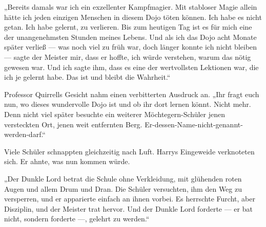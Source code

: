 „Bereits damals war ich ein exzellenter Kampfmagier. Mit stabloser Magie allein hätte ich jeden einzigen Menschen in diesem Dojo töten können. Ich habe es nicht getan. Ich habe gelernt, zu verlieren. Bis zum heutigen Tag ist es für mich eine der unangenehmsten Stunden meines Lebens. Und als ich das Dojo acht Monate später verließ — was noch viel zu früh war, doch länger konnte ich nicht bleiben — sagte der Meister mir, dass er hoffte, ich würde verstehen, warum das nötig gewesen war. Und ich sagte ihm, dass es eine der wertvollsten Lektionen war, die ich je gelernt habe. Das ist und bleibt die Wahrheit.“

Professor Quirrells Gesicht nahm einen verbitterten Ausdruck an.
„Ihr fragt euch nun, wo dieses wundervolle Dojo ist und ob ihr dort lernen könnt. Nicht mehr. Denn nicht viel später besuchte ein weiterer Möchtegern-Schüler jenen versteckten Ort, jenen weit entfernten Berg. Er-dessen-Name-nicht-genannt-werden-darf.“

Viele Schüler schnappten gleichzeitig nach Luft. Harrys Eingeweide verknoteten sich. Er ahnte, was nun kommen würde.

„Der Dunkle Lord betrat die Schule ohne Verkleidung, mit glühenden roten Augen und allem Drum und Dran. Die Schüler versuchten, ihm den Weg zu versperren, und er apparierte einfach an ihnen vorbei. Es herrschte Furcht, aber Disziplin, und der Meister trat hervor. Und der Dunkle Lord forderte — er bat nicht, sondern forderte —, gelehrt zu werden.“

